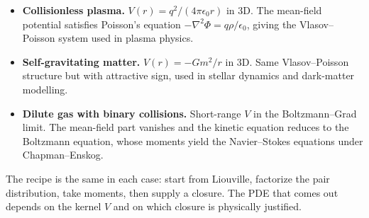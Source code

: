 \documentclass{article}
\begin{document}
\begin{itemize}
\item \textbf{Collisionless plasma.} \(V(r) = q^2/(4\pi\epsilon_0 r)\) in 3D. The mean-field potential satisfies Poisson's equation \(-\nabla^2 \Phi = q\rho/\epsilon_0\), giving the Vlasov--Poisson system used in plasma physics.
\item \textbf{Self-gravitating matter.} \(V(r) = -Gm^2/r\) in 3D. Same Vlasov--Poisson structure but with attractive sign, used in stellar dynamics and dark-matter modelling.
\item \textbf{Dilute gas with binary collisions.} Short-range \(V\) in the Boltzmann--Grad limit. The mean-field part vanishes and the kinetic equation reduces to the Boltzmann equation, whose moments yield the Navier--Stokes equations under Chapman--Enskog.
\end{itemize}

The recipe is the same in each case: start from Liouville, factorize the pair distribution, take moments, then supply a closure. The PDE that comes out depends on the kernel \(V\) and on which closure is physically justified.
\end{document}
